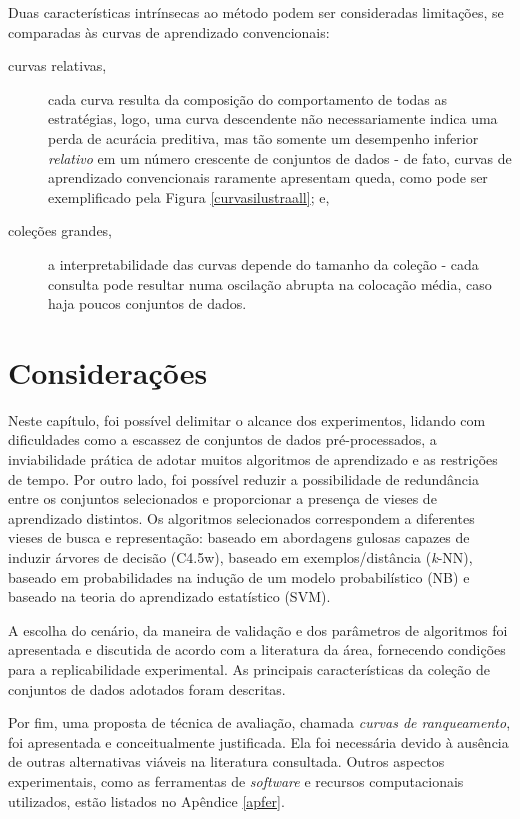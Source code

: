 Duas características intrínsecas ao método podem ser consideradas limitações, se comparadas às curvas de aprendizado convencionais:
\begin{description}
   \item [curvas relativas,] cada curva resulta da composição do comportamento de todas as estratégias, logo, uma curva descendente não necessariamente indica uma perda de acurácia preditiva, mas tão somente um desempenho inferior \textit{relativo} em um número crescente de conjuntos de dados - de fato, curvas de aprendizado convencionais raramente apresentam queda, como pode ser exemplificado pela Figura \ref{curvasilustraall}; e,
   \item [coleções grandes,] a interpretabilidade das curvas depende do tamanho da coleção - cada consulta pode resultar numa oscilação abrupta na colocação média, caso haja poucos conjuntos de dados.
\end{description}

\section{Considerações}\label{sec:consider}
Neste capítulo, foi possível delimitar o alcance dos experimentos, lidando com dificuldades como a escassez de conjuntos de dados pré-processados, a inviabilidade prática de adotar muitos algoritmos de aprendizado e as restrições de tempo.
Por outro lado, foi possível reduzir a possibilidade de redundância entre os conjuntos selecionados e proporcionar a presença de vieses de aprendizado distintos.
Os algoritmos selecionados correspondem a diferentes vieses de busca e representação:
baseado em abordagens gulosas capazes de induzir árvores de decisão (C4.5w), baseado em exemplos/distância (\textit{k}-NN), baseado em probabilidades na indução de um modelo probabilístico (NB) e baseado na teoria do aprendizado estatístico (SVM).

A escolha do cenário, da maneira de validação e dos parâmetros de algoritmos foi apresentada e discutida de acordo com a literatura da área, fornecendo condições para a replicabilidade experimental.
As principais características da coleção de conjuntos de dados adotados foram descritas.

Por fim, uma proposta de técnica de avaliação, chamada \textit{curvas de ranqueamento}, foi apresentada e conceitualmente justificada.
Ela foi necessária devido à ausência de outras alternativas viáveis na literatura consultada.
Outros aspectos experimentais, como as ferramentas de \textit{software} e recursos computacionais utilizados, estão listados no Apêndice \ref{apfer}.



